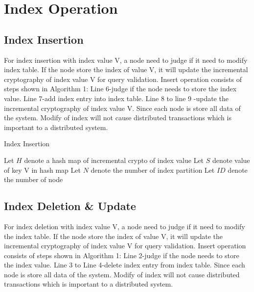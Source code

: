 
\section{Index Operation}
\subsection{Index Insertion}
\vspace{-0.2cm}
For index insertion with index value V, a node need to judge if it need to modify index table. If the node store the
index of value V, it will update the incremental cryptography of index value V for query validation. Insert operation
consists of steps shown in Algorithm 1: Line 6-judge if the node needs to store the index value. Line 7-add index entry
into index table. Line 8 to line 9 -update the incremental cryptography of index value V. Since each node is store all
data of the system. Modify of index will not cause distributed transactions which is important to a distributed system.

\LinesNumbered
\vspace{-0.5cm}
\begin{algorithm}[htb]
	\SetAlgoLined
	\caption{Index Insertion}%
	Let $H$ denote a hash map of incremental crypto of index value\;
	Let $S$ denote value of key V in hash map\;
	Let $N$ denote the number of index partition\;
	Let $ID$ denote the number of node\;
\end{algorithm}


\subsection{Index Deletion \& Update}
\vspace{-0.2cm}
For index deletion with index value V, a node need to judge if it need to modify the index table. If the node store
the index of value V, it will update the incremental cryptography of index value V for query validation. Insert operation
consists of steps shown in Algorithm 1: Line 2-judge if the node needs to store the index value. Line 3 to Line 4-delete
index entry from index table. Since each node is store all data of the system. Modify of index will not cause distributed transactions which is important to a distributed system.

